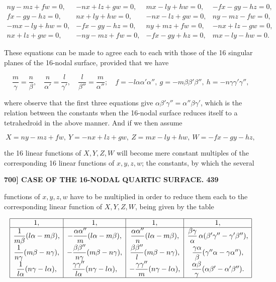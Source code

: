 \documentclass[11pt]{article}
\begin{document}
\[
\begin{array}{llll}
ny - mz + fw = 0, & -nx + lz + gw = 0, & mx - ly + hw = 0, & -fx - gy - hz = 0, \\
fx - gy - hz = 0, & nx + ly + hw = 0, & -nx - lz + gw = 0, & ny - mz - fw = 0, \\
-mx - ly + hw = 0, & -fx - gy - hz = 0, & ny + mz + fw = 0, & -nx + lz - gw = 0, \\
nx + lz + gw = 0, & -ny - mz + fw = 0, & -fx - gy + hz = 0, & mx - ly - hw = 0.
\end{array}
\]

These equations can be made to agree each to each with those of the 16 singular planes of the 16-nodal surface, provided that we have

\[
\frac{m}{\gamma} = \frac{n}{\beta},\quad \frac{n}{\alpha'} = \frac{l}{\gamma'},\quad \frac{l}{\beta''} = \frac{m}{\alpha''};\quad f = -l\alpha\alpha'\alpha'',\ g = -m\beta\beta'\beta'',\ h = -n\gamma\gamma'\gamma'',
\]

where observe that the first three equations give $\alpha\beta'\gamma'' = \alpha''\beta\gamma'$, which is the relation between the constants when the 16-nodal surface reduces itself to a tetrahedroid in the above manner. And if we then assume

\[
X = ny - mz + fw,\ Y = -nx + lz + gw,\ Z = mx - ly + hw,\ W = -fx - gy - hz,
\]

the 16 linear functions of $X, Y, Z, W$ will become mere constant multiples of the corresponding 16 linear functions of $x, y, z, w$; the constants, by which the several

\bigskip
\noindent\textbf{700] \quad CASE OF THE 16-NODAL QUARTIC SURFACE. \hfill 439}

\medskip

functions of $x, y, z, w$ have to be multiplied in order to reduce them each to the corresponding linear function of $X, Y, Z, W$, being given by the table

\[
\resizebox{\textwidth}{!}{$\displaystyle
\begin{array}{|c|c|c|c|}
\hline
1, & 1, & 1, & 1, \\
\hline
\dfrac{1}{m\beta}(l\alpha - m\beta), & -\dfrac{\alpha\alpha''}{m}(l\alpha - m\beta), & \dfrac{\alpha\alpha''}{n}(l\alpha - m\beta), & \dfrac{\beta\gamma}{\alpha}\,\alpha(\beta'\gamma'' - \gamma'\beta''), \\[4pt]
\dfrac{1}{n\gamma}(m\beta - n\gamma), & -\dfrac{\beta\beta''}{n\gamma}(m\beta - n\gamma), & \dfrac{\beta\beta''}{l}(m\beta - n\gamma), & \dfrac{\gamma\alpha}{\beta}(\gamma''\alpha - \gamma\alpha''), \\[4pt]
\dfrac{1}{l\alpha}(n\gamma - l\alpha), & \dfrac{\gamma\gamma''}{l\alpha}(n\gamma - l\alpha), & -\dfrac{\gamma\gamma''}{m}(n\gamma - l\alpha), & \dfrac{\alpha\beta}{\gamma}(\alpha\beta' - \alpha'\beta''). \\
\hline
\end{array}
$}
\]
\end{document}
